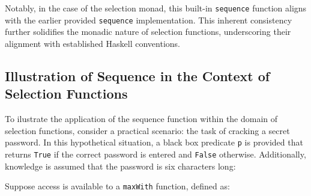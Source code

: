 \documentclass[runningheads]{llncs}
\begin{document}
\begin{Shaded}
\begin{Highlighting}[]
\NormalTok{ [}\NormalTok{ r a] }\OtherTok{{-}\textgreater{}} 
\OperatorTok{:}\OtherTok{=}\OperatorTok{\textgreater{}\textgreater{}=}\OtherTok{{-}\textgreater{}}\OperatorTok{\textgreater{}\textgreater{}=}\OtherTok{{-}\textgreater{}} \OperatorTok{:}
\end{Highlighting}
\end{Shaded}

Notably, in the case of the selection monad, this built-in
\texttt{sequence\textquotesingle{}} function aligns with the earlier
provided \texttt{sequence} implementation. This inherent consistency
further solidifies the monadic nature of selection functions,
underscoring their alignment with established Haskell conventions.

\subsection{Illustration of Sequence in the Context of Selection
Functions}\label{illustration-of-sequence-in-the-context-of-selection-functions}

To ilustrate the application of the sequence function within the domain
of selection functions, consider a practical scenario: the task of
cracking a secret password. In this hypothetical situation, a black box
predicate \texttt{p} is provided that returns \texttt{True} if the
correct password is entered and \texttt{False} otherwise. Additionally,
knowledge is assumed that the password is six characters long:

\begin{Shaded}
\begin{Highlighting}[]
  \OtherTok{{-}\textgreater{}} 
 \OtherTok{=} 
\OtherTok{=} 
\end{Highlighting}
\end{Shaded}

Suppose access is available to a \texttt{maxWith} function, defined as:
\end{document}
